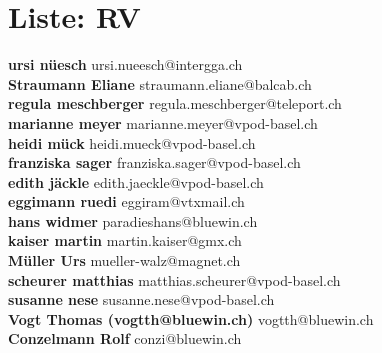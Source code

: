 \documentclass{scrartcl}
\begin{document}
\section*{Liste: RV}
\textbf{ursi nüesch   } ursi.nueesch@intergga.ch\\
\textbf{Straumann Eliane } straumann.eliane@balcab.ch\\
\textbf{regula meschberger } regula.meschberger@teleport.ch\\
\textbf{marianne meyer } marianne.meyer@vpod-basel.ch\\
\textbf{heidi mück   } heidi.mueck@vpod-basel.ch\\
\textbf{franziska sager } franziska.sager@vpod-basel.ch\\
\textbf{edith jäckle   } edith.jaeckle@vpod-basel.ch\\
\textbf{eggimann ruedi } eggiram@vtxmail.ch\\
\textbf{hans widmer } paradieshans@bluewin.ch\\
\textbf{kaiser martin } martin.kaiser@gmx.ch\\
\textbf{Müller Urs   } mueller-walz@magnet.ch\\
\textbf{scheurer matthias } matthias.scheurer@vpod-basel.ch\\
\textbf{susanne nese } susanne.nese@vpod-basel.ch\\
\textbf{Vogt Thomas (vogtth@bluewin.ch) } vogtth@bluewin.ch\\
\textbf{Conzelmann Rolf } conzi@bluewin.ch\\
\end{document}
